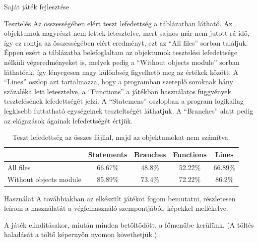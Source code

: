 \begin{MyChapter}{Saját játék fejlesztése}
\begin{MySection}{Tesztelés}
		Az összességében elért teszt lefedettség a  táblázatban látható. Az objektumok nagyrészt nem lettek letesztelve, mert sajnos már nem jutott rá idő, így ez rontja az összességében elért eredményt, ezt az ``All files'' sorban találjuk. Éppen ezért a táblázatba belefoglaltam az objektumok tesztelési lefedettsége nélküli végeredményeket is, melyek pedig a ``Without objects module'' sorban láthatóak, így lényegesen nagy különbség figyelhető meg az értékek között.
		A ``Lines'' oszlop azt tartalmazza, hogy a programban szereplő soroknak hány százaléka lett letesztelve, a ``Functions'' a játékban használatos függvények tesztelésének lefedettségét jelzi.
		A ``Statemens'' oszlopban a program logikailag legkisebb futtatható egységeinek teszteltségét láthatjuk.
		A ``Branches'' alatt pedig az elágazások ágainak lefedettségét értjük.
			
		\begin{table}[h]
			\centering
			\caption{Teszt lefedettség az összes fájllal, majd az objektumokat nem számítva.}
			\label{tab:teszt_lefedettseg}
			\begin{tabular}{l|c|c|c|c|}
				\cline{2-5}
				& Statements & Branches & Functions & Lines \\ \hline
				\multicolumn{1}{|l|}{All files} & 66.67\% & 48.8\% & 52.22\% & 66.89\% \\ \hline
				\multicolumn{1}{|l|}{Without objects module} & 85.89\% & 73.4\% & 72.22\% & 86.2\% \\ \hline
			\end{tabular}
		\end{table}
		
	\end{MySection}

	\begin{MySection}{Használat}
		A továbbiakban az elkészült játékot fogom bemutatni, részletesen leírom a használatát a végfelhasználó szempontjából, képekkel mellékelve.
		
		A játék elindításakor, miután minden betöltődött, a főmenübe kerülünk. (A töltés haladását a töltő képernyőn nyomon követhetjük.)


\end{MySection}
\end{MyChapter}

